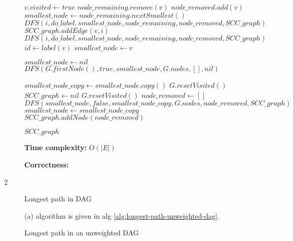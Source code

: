 \documentclass{article}
\begin{document}
\begin{description}
\begin{algorithm}[h]
\begin{algorithmic}[1]
      \State $v.visited \gets true$
        \State $node\_remaining.remove(v)$
        \State $node\_removed.add(v)$
          \State $smallest\_node \gets node\_remaining.nextSmallest()$
        \EndIf
      \EndIf
          \State $DFS(i, do\_label, smallest\_node, node\_remaining, node\_removed, SCC\_graph)$
        \Else
            \State $SCC\_graph.addEdge(v,i)$
          \Else
            \State $DFS(i, do\_label, smallest\_node, node\_remaining, node\_removed, SCC\_graph)$
          \EndIf
        \EndIf
      \EndFor
        \State $id \gets label(v)$
          \State $smallest\_node \gets v$
        \EndIf
      \EndIf
    \EndFunction

      \State $smallest\_node \gets nil$
      \State $DFS(G.firstNode(), true, smallest\_node, G.nodes, [], nil)$

      \State $smallest\_node\_copy \gets smallest\_node.copy()$
      \State $G.resetVisited()$
      \State $SCC\_graph \gets nil$
        \State $G.resetVisited()$
        \State $node\_removed \gets []$
        \State $DFS(smallest\_node, false, smallest\_node\_copy, G.nodes, node\_removed, SCC\_graph)$
        \State $smallest\_node \gets smallest\_node\_copy$
        \State $SCC\_graph.addNode(node\_removed)$
      \EndWhile

      \State \Return $SCC\_graph$
    \EndFunction
    
    \end{algorithmic}
  \end{algorithm}

  \textbf{Time complexity:} $O(|E|)$

  \textbf{Correctness:} 

\item[2]{Longest path in DAG}

  (a) algorithm is given in alg \ref{alg:longest-path-unweighted-dag}.

  \begin{algorithm}[h]
  \caption{Longest path in an unweighted DAG}
  \label{alg:longest-path-unweighted-DAG}
    \begin{algorithmic}[1]
  

\end{algorithmic}
\end{algorithm}
\end{description}
\end{document}
